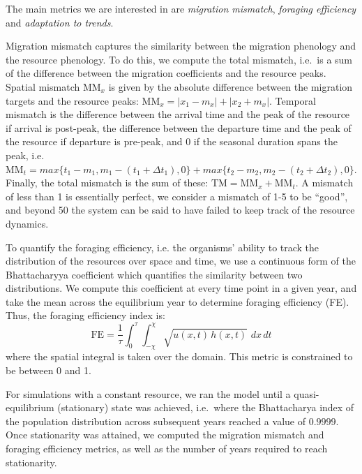 \documentclass[utf8]{frontiersSCNS} %
\begin{document}
	The main metrics we are interested in are \emph{migration mismatch}, \emph{foraging efficiency} and \emph{adaptation to trends}.
	
	Migration mismatch captures the similarity between the migration phenology and the resource phenology. To do this, we compute the total mismatch, i.e.~is a sum of the difference between the migration coefficients and the resource peaks. Spatial mismatch $\text{MM}_x$ is given by the absolute difference between the migration targets and the resource peaks: $\text{MM}_x = |x_1 - m_x| + |x_2 + m_x|$. Temporal mismatch is the difference between the arrival time and the peak of the resource if arrival is post-peak, the difference between the departure time and the peak of the resource if departure is pre-peak, and 0 if the seasonal duration spans the peak, i.e.~$\text{MM}_t = max\{t_1 - m_1, m_1 - (t_1 + \Delta t_1), 0\} + max\{t_2 - m_2, m_2 - (t_2 + \Delta t_2), 0\}$. Finally, the total mismatch is the sum of these: $\text{TM} = \text{MM}_x + \text{MM}_t$. A mismatch of less than 1 is essentially perfect, we consider a mismatch of 1-5 to be ``good'', and beyond 50 the system can be said to have failed to keep track of the resource dynamics.
	
	To quantify the foraging efficiency, i.e. the organisms' ability to track the distribution of the resources over space and time, we use a continuous form of the Bhattacharyya coefficient \citep{Bhattacharyya1943} which quantifies the similarity between two distributions. We compute this coefficient at every time point in a given year, and take the mean across the equilibrium year to determine foraging efficiency (FE). Thus, the foraging efficiency index is:
	$$\text{FE} = \frac{1}{\tau} \int_{0}^\tau \int_{-\chi}^{\chi} \sqrt{u(x,t) \, h(x,t)} \,\, dx\,dt$$
	\noindent where the spatial integral is taken over the domain. This metric is constrained to be between 0 and 1.
	
	For simulations with a constant resource, we ran the model until a quasi-equilibrium (stationary) state was achieved, i.e.~where the Bhattacharya index of the population distribution across subsequent years reached a value of $0.9999$. Once stationarity was attained, we computed the migration mismatch and foraging efficiency metrics, as well as the number of years required to reach stationarity.
	
\end{document}
